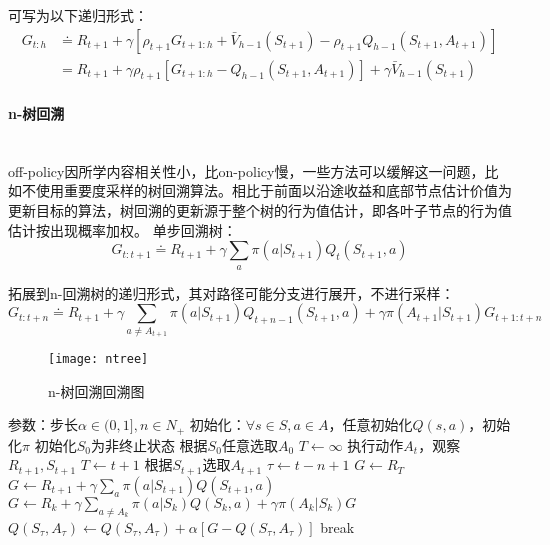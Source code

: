 \documentclass[
12pt, %
a4paper, 
oneside, %
headinclude,footinclude, %
]{scrartcl}
\begin{document}
可写为以下递归形式：
\begin{align*}
G_{t:h} 
&\doteq R_{t + 1} + \gamma[\rho_{t + 1} G_{t + 1:h} + \bar{V}_{h - 1}(S_{t + 1}) - \rho_{t + 1} Q_{h - 1}(S_{t + 1}, A_{t + 1})] \\
&= R_{t + 1} + \gamma \rho_{t + 1}[G_{t + 1:h} - Q_{h - 1}(S_{t + 1}, A_{t + 1})] + \gamma \bar{V}_{h - 1}(S_{t + 1})
\end{align*}
\paragraph{n-树回溯}~\\

off-policy因所学内容相关性小，比on-policy慢，一些方法可以缓解这一问题，比如不使用重要度采样的树回溯算法。相比于前面以沿途收益和底部节点估计价值为更新目标的算法，树回溯的更新源于整个树的行为值估计，即各叶子节点的行为值估计按出现概率加权。
单步回溯树：
$$ G_{t:t + 1} \doteq R_{t + 1} + \gamma \sum_{a} \pi(a|S_{t + 1}) Q_t(S_{t + 1}, a) $$

拓展到n-回溯树的递归形式，其对路径可能分支进行展开，不进行采样：
$$ G_{t:t + n} \doteq R_{t + 1} + \gamma \sum_{a \neq A_{t + 1}} \pi(a|S_{t + 1}) Q_{t + n - 1}(S_{t + 1}, a) + \gamma \pi(A_{t + 1}|S_{t + 1}) G_{t + 1:t + n} $$

\begin{figure}[H]
\centering
\texttt{[image: ntree]}
\caption[n-树回溯回溯图]{n-树回溯回溯图}
\end{figure}
\begin{myalgorithm}[n-树回溯]
\State 参数：步长$ \alpha \in (0,1], n \in N_+ $
\State 初始化：$ \forall s \in S, a \in A $，任意初始化$ Q(s, a) $，初始化$ \pi $
\State 初始化$ S_0 $为非终止状态
\State 根据$ S_0 $任意选取$ A_0 $
\State $ T \gets \infty $
\State 执行动作$ A_t $，观察$ R_{t + 1},S_{t + 1} $
\State $ T \gets t + 1 $
\Else
\State 根据$ S_{t + 1} $选取$ A_{t + 1} $
\EndIf
\EndIf
\State $ \tau \gets t - n + 1 $ 
\State $ G \gets R_T $ 
\Else
\State $ G \gets R_{t + 1} + \gamma \sum_a \pi(a|S_{t + 1})Q(S_{t + 1}, a) $
\EndIf
{}
\State $ G \gets R_k + \gamma \sum_{a \neq A_k} \pi(a|S_k)Q(S_k,a) + \gamma \pi(A_k|S_k)G $
\EndFor
\State $ Q(S_{\tau}, A_{\tau}) \gets Q(S_{\tau}, A_{\tau}) + \alpha[G - Q(S_{\tau}, A_{\tau})] $
\EndIf
{}
\State break
\EndIf
\EndFor
\EndFor
\end{myalgorithm}
\end{document}
